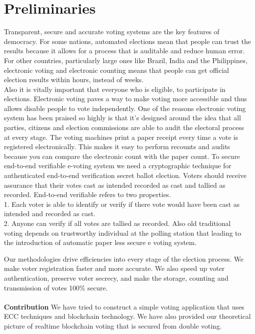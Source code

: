 \documentclass{report}
\begin{document}
\section{Preliminaries}
 Transparent, secure and accurate voting systems are the key features of democracy. For some nations, automated elections mean that people can trust the results because it allows for a process that is auditable and reduce human error. For other countries, particularly large ones like Brazil, India and the Philippines, electronic voting and electronic counting means that people can get official election results within hours, instead of weeks. \\
Also it is vitally important that everyone who is eligible, to participate in elections. Electronic voting paves a way to make voting more accessible and thus allows disable people to vote independently.
One of the reasons electronic voting system has been praised so highly is that it’s designed around the idea that all parties, citizens and election commissions are able to audit the electoral process at every stage. The voting machines print a paper receipt every time a vote is registered electronically. This makes it easy to perform recounts and audits because you can compare the electronic count with the paper count.\cite{WinNT7}
To secure end-to-end verifiable e-voting system we need a cryptographic technique for authenticated end-to-end verification secret ballot election. Voters should receive assurance that their votes cast as intended recorded as cast and tallied as recorded. End-to-end verifiable refers to two properties. \\
1. Each voter is able to identify or verify if there vote would have been cast as intended and recorded as cast. \\
2. Anyone can verify if all votes are tallied as recorded. Also old traditional voting depends on trustworthy individual at the polling station that leading to the introduction of automatic paper less secure e voting system.


Our methodologies drive efficiencies into every stage of the election process. We make voter registration faster and more accurate. We also speed up voter authentication, preserve voter secrecy, and make the storage, counting and transmission of votes 100$ \% $ secure.\\
\\
\textbf{Contribution} We have tried to construct a simple voting application that uses ECC techniques and blockchain technology. We have also provided our theoretical picture of realtime blockchain voting that is secured from double voting.
\end{document}
